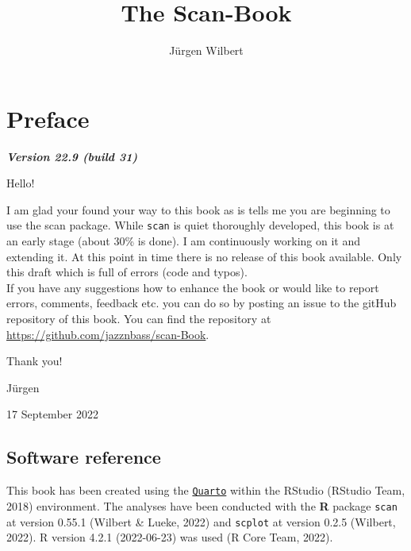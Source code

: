 \documentclass[
  letterpaper,
  DIV=11,
  numbers=noendperiod]{scrreprt}
\title{The Scan-Book}
\author{Jürgen Wilbert}
\date{}
\renewcommand*\contentsname{Table of contents}
\newcommand\contentsname{Table of contents}
\begin{document}
\maketitle
\ifdefined\Shaded\renewenvironment{Shaded}{\begin{tcolorbox}[borderline west={3pt}{0pt}{shadecolor}, boxrule=0pt, interior hidden, enhanced, frame hidden, sharp corners, breakable]}{\end{tcolorbox}}\fi

\renewcommand*\contentsname{Table of contents}
{
\hypersetup{linkcolor=}
\setcounter{tocdepth}{2}
\tableofcontents
}

\hypertarget{preface}{%
\chapter*{Preface}\label{preface}}

\textbf{\emph{Version 22.9 (build 31)}}

Hello!

I am glad your found your way to this book as is tells me you are
beginning to use the scan package. While \texttt{scan} is quiet
thoroughly developed, this book is at an early stage (about 30\% is
done). I am continuously working on it and extending it. At this point
in time there is no release of this book available. Only this draft
which is full of errors (code and typos).\\
If you have any suggestions how to enhance the book or would like to
report errors, comments, feedback etc. you can do so by posting an issue
to the gitHub repository of this book. You can find the repository at
\url{https://github.com/jazznbass/scan-Book}.

Thank you!

Jürgen

17 September 2022

\hypertarget{software-reference}{%
\section*{Software reference}\label{software-reference}}

This book has been created using the
\href{https://quarto.org/}{\texttt{Quarto}} within the RStudio (RStudio
Team, 2018) environment. The analyses have been conducted with the
\textbf{R} package \texttt{scan} at version 0.55.1 (Wilbert \& Lueke,
2022) and \texttt{scplot} at version 0.2.5 (Wilbert, 2022). R version
4.2.1 (2022-06-23) was used (R Core Team, 2022).
\end{document}
